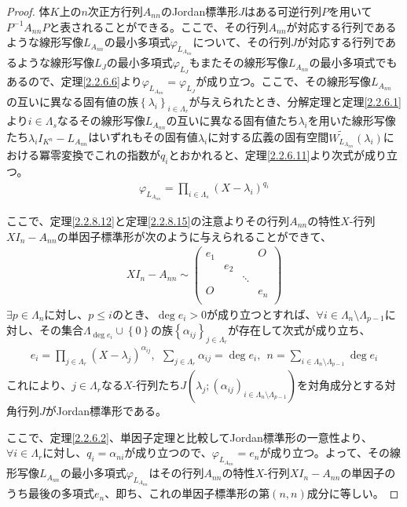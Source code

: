 \documentclass[dvipdfmx]{jsarticle}
\begin{document}
\begin{proof}
体$K$上の$n$次正方行列$A_{nn}$のJordan標準形$J$はある可逆行列$P$を用いて$P^{- 1}A_{nn}P$と表されることができる。ここで、その行列$A_{nn}$が対応する行列であるような線形写像$L_{A_{nn}}$の最小多項式$\varphi_{L_{A_{nn}}}$について、その行列$J$が対応する行列であるような線形写像$L_{J}$の最小多項式$\varphi_{L_{J}}$もまたその線形写像$L_{A_{nn}}$の最小多項式でもあるので、定理\ref{2.2.6.6}より$\varphi_{L_{A_{nn}}} = \varphi_{L_{J}}$が成り立つ。ここで、その線形写像$L_{A_{nn}}$の互いに異なる固有値の族$\left\{ \lambda_{i} \right\}_{i \in \varLambda_{r}}$が与えられたとき、分解定理と定理\ref{2.2.6.1}より$i \in \varLambda_{s}$なるその線形写像$L_{A_{nn}}$の互いに異なる固有値たち$\lambda_{i}$を用いた線形写像たち$\lambda_{i}I_{K^{n}} - L_{A_{nn}}$はいずれもその固有値$\lambda_{i}$に対する広義の固有空間$\widetilde{W_{L_{A_{nn}}}}\left( \lambda_{i} \right)$における冪零変換でこれの指数が$q_{i}$とおかれると、定理\ref{2.2.6.11}より次式が成り立つ。
\begin{align*}
\varphi_{L_{A_{nn}}} = \prod_{i \in \varLambda_{s}} \left( X - \lambda_{i} \right)^{q_{i}}
\end{align*}\par
ここで、定理\ref{2.2.8.12}と定理\ref{2.2.8.15}の注意よりその行列$A_{nn}$の特性$X$-行列$XI_{n} - A_{nn}$の単因子標準形が次のように与えられることができて、
\begin{align*}
XI_{n} - A_{nn} \sim \begin{pmatrix}
e_{1} & \  & \  & O \\
\  & e_{2} & \  & \  \\
\  & \  & \ddots & \  \\
O & \  & \  & e_{n} \\
\end{pmatrix}
\end{align*}
$\exists p \in \varLambda_{n}$に対し、$p \leq i$のとき、$\deg e_{i} > 0$が成り立つとすれば、$\forall i \in \varLambda_{n} \setminus \varLambda_{p - 1}$に対し、その集合$\varLambda_{\deg e_{i}} \cup \left\{ 0 \right\}$の族$\left\{ \alpha_{ij} \right\}_{j \in \varLambda_{r}}$が存在して次式が成り立ち、
\begin{align*}
e_{i} = \prod_{j \in \varLambda_{r}} \left( X - \lambda_{j} \right)^{\alpha_{ij}},\ \ \sum_{j \in \varLambda_{r}} \alpha_{ij} = \deg e_{i},\ \ n = \sum_{i \in \varLambda_{n} \setminus \varLambda_{p - 1}} {\deg e_{i}}
\end{align*}
これにより、$j \in \varLambda_{r}$なる$X$-行列たち$J\left( \lambda_{j};\left( \alpha_{ij} \right)_{i \in \varLambda_{n} \setminus \varLambda_{p - 1}} \right)$を対角成分とする対角行列$J$がJordan標準形である。\par
ここで、定理\ref{2.2.6.2}、単因子定理と比較してJordan標準形の一意性より、$\forall i \in \varLambda_{r}$に対し、$q_{i} = \alpha_{ni}$が成り立つので、$\varphi_{L_{A_{nn}}} = e_{n}$が成り立つ。よって、その線形写像$L_{A_{nn}}$の最小多項式$\varphi_{L_{A_{nn}}}$はその行列$A_{nn}$の特性$X$-行列$XI_{n} - A_{nn}$の単因子のうち最後の多項式$e_{n}$、即ち、これの単因子標準形の第$(n,n)$成分に等しい。
\end{proof}\par
\end{document}
